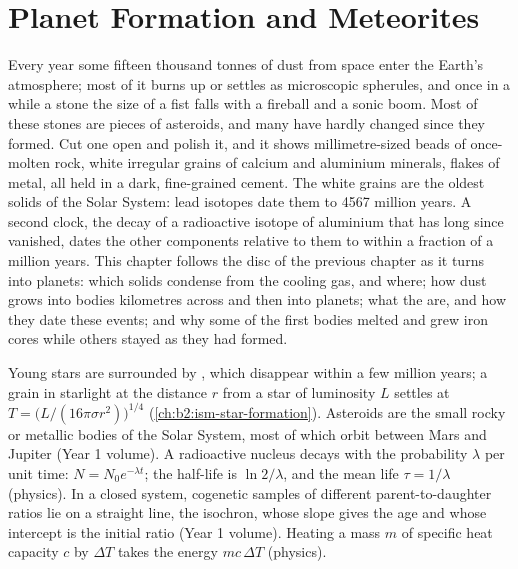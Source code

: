 \chapter{Planet Formation and Meteorites}\label{ch:b2:planet-formation-meteorites}

Every year some fifteen thousand tonnes of dust from space enter the Earth's
atmosphere; most of it burns up or settles as microscopic spherules, and once
in a while a stone the size of a fist falls with a fireball and a sonic boom.
Most of these stones are pieces of asteroids, and many have hardly changed
since they formed. Cut one open and polish it, and it shows millimetre-sized
beads of once-molten rock, white irregular grains of calcium and aluminium
minerals, flakes of metal, all held in a dark, fine-grained cement. The white
grains are the oldest solids of the Solar System: lead isotopes date them to
4567 million years. A second clock, the decay of a radioactive isotope of
aluminium that has long since vanished, dates the other components relative to
them to within a fraction of a million years. This chapter follows the disc of
the previous chapter as it turns into planets: which solids condense from the
cooling gas, and where; how dust grows into bodies kilometres across and then
into planets; what the  are, and how they date these events; and why
some of the first bodies melted and grew iron cores while others stayed as they
had formed.

\begin{recall}
Young stars are surrounded by , which disappear within a
few million years; a grain in starlight at the distance $r$ from a star of
luminosity $L$ settles at $T = \bigl(L/(16\pi\sigma r^2)\bigr)^{1/4}$
(\cref{ch:b2:ism-star-formation}). Asteroids are the small rocky or metallic
bodies of the Solar System, most of which orbit between Mars and Jupiter (Year 1
volume). A radioactive nucleus decays with the probability $\lambda$ per unit
time: $N = N_0 e^{-\lambda t}$; the half-life is $\ln 2/\lambda$, and the mean
life $\tau = 1/\lambda$ (physics). In a closed system, cogenetic samples of
different parent-to-daughter ratios lie on a straight line, the isochron, whose
slope gives the age and whose intercept is the initial ratio (Year 1 volume).
Heating a mass $m$ of specific heat capacity $c$ by $\Delta T$ takes the energy
$mc\,\Delta T$ (physics).
\end{recall}

